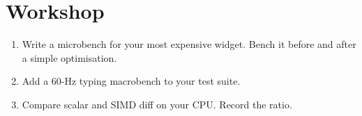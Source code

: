 \section*{Workshop}

\begin{enumerate}[leftmargin=*]
  \item Write a microbench for your most expensive widget.
    Bench it before and after a simple optimisation.
  \item Add a 60-Hz typing macrobench to your test suite.
  \item Compare scalar and SIMD diff on your CPU. Record the
    ratio.
\end{enumerate}
